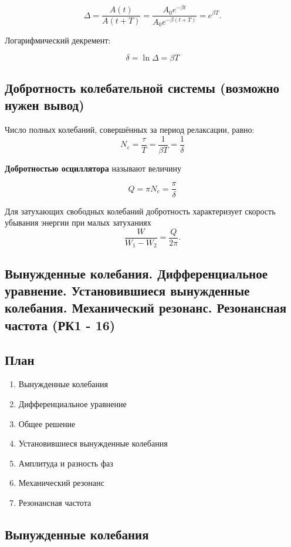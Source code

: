 \documentclass[a4paper,12pt]{article}
\begin{document}
\[
\Delta = \frac{A(t)}{A(t+T)} 
=
\frac{A_0 e^{-\beta t}}{A_0 e^{-\beta(t+T)}}
= e^{\beta T}.
\]

Логарифмический декремент:

\[
\delta = \ln \Delta = \beta T
\]

\subsection*{Добротность колебательной системы (возможно нужен вывод)}

Число полных колебаний, совершённых за период релаксации, равно:
\[
N_{\varepsilon} = \frac{\tau}{T} = \frac{1}{\beta T} = \frac{1}{\delta}
\]

\begin{definitionbox}



\textbf{Добротностью осциллятора} называют величину

\[
Q = \pi N_e = \frac{\pi}{\delta}
\]
\end{definitionbox}

 
Для затухающих свободных колебаний добротность характеризует скорость убывания энергии при малых затуханиях
\[
\frac{W}{W_1 - W_2} = \frac{Q}{2\pi}.
\]
 
\subsection{Вынужденные колебания. Дифференциальное уравнение. Установившиеся вынужденные колебания. Механический резонанс. Резонансная частота (РК1 - 16)}

\subsection*{План}
\begin{enumerate}
\item Вынужденные колебания
\item Дифференциальное уравнение
\item Общее решение
\item Установившиеся вынужденные колебания
\item Амплитуда и разность фаз
\item Механический резонанс
\item Резонансная частота
\end{enumerate}

\subsection*{Вынужденные колебания}
\end{document}
